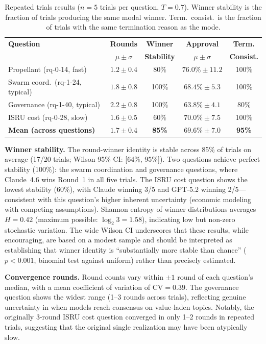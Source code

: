 \documentclass[11pt,a4paper]{article}
\begin{document}
\begin{table}[ht]
\centering
\caption{Repeated trials results ($n = 5$ trials per question, $T = 0.7$). Winner stability is the fraction of trials producing the same modal winner. Term.\ consist.\ is the fraction of trials with the same termination reason as the mode.}
\label{tab:repeated_trials}
\begin{tabular}{@{}lcccc@{}}
\toprule
\textbf{Question} & \textbf{Rounds} & \textbf{Winner} & \textbf{Approval} & \textbf{Term.} \\
 & $\mu \pm \sigma$ & \textbf{Stability} & $\mu \pm \sigma$ & \textbf{Consist.} \\
\midrule
Propellant (rq-0-14, fast) & $1.2 \pm 0.4$ & 80\% & $76.0\% \pm 11.2$ & 100\% \\
Swarm coord.\ (rq-1-24, typical) & $1.8 \pm 0.8$ & 100\% & $68.4\% \pm 5.3$ & 100\% \\
Governance (rq-1-40, typical) & $2.2 \pm 0.8$ & 100\% & $63.8\% \pm 4.1$ & 80\% \\
ISRU cost (rq-0-28, slow) & $1.6 \pm 0.5$ & 60\% & $70.0\% \pm 7.5$ & 100\% \\
\midrule
\textbf{Mean (across questions)} & $1.7 \pm 0.4$ & \textbf{85\%} & $69.6\% \pm 7.0$ & \textbf{95\%} \\
\bottomrule
\end{tabular}
\end{table}

\textbf{Winner stability.} The round-winner identity is stable across 85\% of trials on average (17/20 trials; Wilson 95\% CI: [64\%, 95\%]). Two questions achieve perfect stability (100\%): the swarm coordination and governance questions, where Claude~4.6 wins Round~1 in all five trials. The ISRU cost question shows the lowest stability (60\%), with Claude winning 3/5 and GPT-5.2 winning 2/5---consistent with this question's higher inherent uncertainty (economic modeling with competing assumptions). Shannon entropy of winner distributions averages $H = 0.42$ (maximum possible: $\log_2 3 = 1.58$), indicating low but non-zero stochastic variation. The wide Wilson CI underscores that these results, while encouraging, are based on a modest sample and should be interpreted as establishing that winner identity is ``substantially more stable than chance'' ($p < 0.001$, binomial test against uniform) rather than precisely estimated.

\textbf{Convergence rounds.} Round counts vary within $\pm 1$ round of each question's median, with a mean coefficient of variation of $\text{CV} = 0.39$. The governance question shows the widest range (1--3 rounds across trials), reflecting genuine uncertainty in when models reach consensus on value-laden topics. Notably, the originally 3-round ISRU cost question converged in only 1--2 rounds in repeated trials, suggesting that the original single realization may have been atypically slow.
\end{document}

